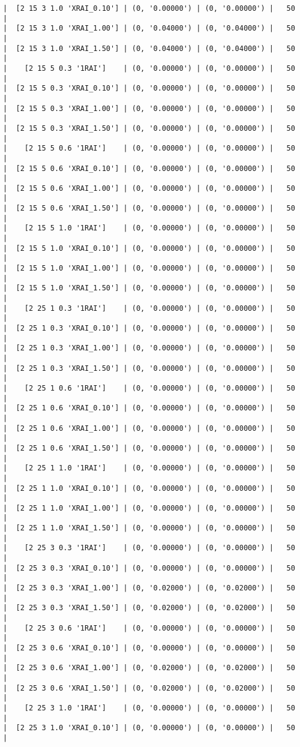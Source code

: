 \documentclass{article}
\begin{document}
\begin{verbatim}
|  [2 15 3 1.0 'XRAI_0.10'] | (0, '0.00000') | (0, '0.00000') |   50  |
|  [2 15 3 1.0 'XRAI_1.00'] | (0, '0.04000') | (0, '0.04000') |   50  |
|  [2 15 3 1.0 'XRAI_1.50'] | (0, '0.04000') | (0, '0.04000') |   50  |
|    [2 15 5 0.3 '1RAI']    | (0, '0.00000') | (0, '0.00000') |   50  |
|  [2 15 5 0.3 'XRAI_0.10'] | (0, '0.00000') | (0, '0.00000') |   50  |
|  [2 15 5 0.3 'XRAI_1.00'] | (0, '0.00000') | (0, '0.00000') |   50  |
|  [2 15 5 0.3 'XRAI_1.50'] | (0, '0.00000') | (0, '0.00000') |   50  |
|    [2 15 5 0.6 '1RAI']    | (0, '0.00000') | (0, '0.00000') |   50  |
|  [2 15 5 0.6 'XRAI_0.10'] | (0, '0.00000') | (0, '0.00000') |   50  |
|  [2 15 5 0.6 'XRAI_1.00'] | (0, '0.00000') | (0, '0.00000') |   50  |
|  [2 15 5 0.6 'XRAI_1.50'] | (0, '0.00000') | (0, '0.00000') |   50  |
|    [2 15 5 1.0 '1RAI']    | (0, '0.00000') | (0, '0.00000') |   50  |
|  [2 15 5 1.0 'XRAI_0.10'] | (0, '0.00000') | (0, '0.00000') |   50  |
|  [2 15 5 1.0 'XRAI_1.00'] | (0, '0.00000') | (0, '0.00000') |   50  |
|  [2 15 5 1.0 'XRAI_1.50'] | (0, '0.00000') | (0, '0.00000') |   50  |
|    [2 25 1 0.3 '1RAI']    | (0, '0.00000') | (0, '0.00000') |   50  |
|  [2 25 1 0.3 'XRAI_0.10'] | (0, '0.00000') | (0, '0.00000') |   50  |
|  [2 25 1 0.3 'XRAI_1.00'] | (0, '0.00000') | (0, '0.00000') |   50  |
|  [2 25 1 0.3 'XRAI_1.50'] | (0, '0.00000') | (0, '0.00000') |   50  |
|    [2 25 1 0.6 '1RAI']    | (0, '0.00000') | (0, '0.00000') |   50  |
|  [2 25 1 0.6 'XRAI_0.10'] | (0, '0.00000') | (0, '0.00000') |   50  |
|  [2 25 1 0.6 'XRAI_1.00'] | (0, '0.00000') | (0, '0.00000') |   50  |
|  [2 25 1 0.6 'XRAI_1.50'] | (0, '0.00000') | (0, '0.00000') |   50  |
|    [2 25 1 1.0 '1RAI']    | (0, '0.00000') | (0, '0.00000') |   50  |
|  [2 25 1 1.0 'XRAI_0.10'] | (0, '0.00000') | (0, '0.00000') |   50  |
|  [2 25 1 1.0 'XRAI_1.00'] | (0, '0.00000') | (0, '0.00000') |   50  |
|  [2 25 1 1.0 'XRAI_1.50'] | (0, '0.00000') | (0, '0.00000') |   50  |
|    [2 25 3 0.3 '1RAI']    | (0, '0.00000') | (0, '0.00000') |   50  |
|  [2 25 3 0.3 'XRAI_0.10'] | (0, '0.00000') | (0, '0.00000') |   50  |
|  [2 25 3 0.3 'XRAI_1.00'] | (0, '0.02000') | (0, '0.02000') |   50  |
|  [2 25 3 0.3 'XRAI_1.50'] | (0, '0.02000') | (0, '0.02000') |   50  |
|    [2 25 3 0.6 '1RAI']    | (0, '0.00000') | (0, '0.00000') |   50  |
|  [2 25 3 0.6 'XRAI_0.10'] | (0, '0.00000') | (0, '0.00000') |   50  |
|  [2 25 3 0.6 'XRAI_1.00'] | (0, '0.02000') | (0, '0.02000') |   50  |
|  [2 25 3 0.6 'XRAI_1.50'] | (0, '0.02000') | (0, '0.02000') |   50  |
|    [2 25 3 1.0 '1RAI']    | (0, '0.00000') | (0, '0.00000') |   50  |
|  [2 25 3 1.0 'XRAI_0.10'] | (0, '0.00000') | (0, '0.00000') |   50  |

\end{verbatim}
\end{document}
